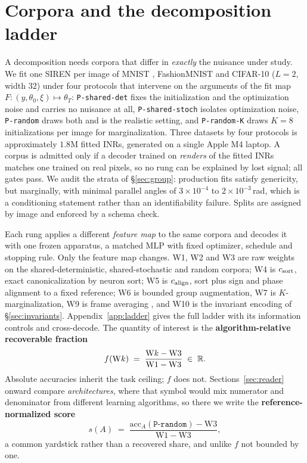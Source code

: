 \section{Corpora and the decomposition ladder}\label{sec:bench}

A decomposition needs corpora that differ in \emph{exactly} the nuisance under study. We fit one
SIREN per image of MNIST \citep{lecun1998mnist}, FashionMNIST \citep{xiao2017fashion} and CIFAR-10
\citep{krizhevsky2009cifar} ($L=2$, width $32$) under four protocols that intervene on the arguments
of the fit map $F : (y, \theta_0, \xi) \mapsto \theta_T$: \texttt{P-shared-det} fixes the
initialization and the optimization noise and carries no nuisance at all, \texttt{P-shared-stoch}
isolates optimization noise, \texttt{P-random} draws both and is the realistic setting, and
\texttt{P-random-K} draws $K=8$ initializations per image for marginalization. Three datasets by
four protocols is approximately $1.8$M fitted INRs, generated on a single Apple M4 laptop. A corpus
is admitted only if a decoder trained on \emph{renders} of the fitted INRs matches one trained on
real pixels, so no rung can be explained by lost signal; all gates pass. We audit the strata of
\S\ref{sec:group}: production fits satisfy genericity, but marginally, with minimal parallel angles
of $3\times10^{-4}$ to $2\times10^{-3}$\,rad, which is a conditioning statement rather than an
identifiability failure. Splits are assigned by image and enforced by a schema check.

Each rung applies a different \emph{feature map} to the same corpora and decodes it with one frozen
apparatus, a matched MLP with fixed optimizer, schedule and stopping rule. Only the feature map
changes. W1, W2 and W3 are raw weights on the shared-deterministic, shared-stochastic and random
corpora; W4 is $c_{\mathrm{sort}}$, exact canonicalization by neuron sort; W5 is $c_{\mathrm{align}}$, sort plus sign and
phase alignment to a fixed reference; W6 is bounded group augmentation, W7 is $K$-marginalization,
W9 is frame averaging \citep{puny2022frame}, and W10 is the invariant encoding of
\S\ref{sec:invariants}. Appendix~\ref{app:ladder} gives the full ladder with its information
controls and cross-decode. The quantity of interest is the \textbf{algorithm-relative recoverable
fraction}
\begin{equation}
f(\mathrm{W}k) \;=\; \frac{\mathrm{W}k - \mathrm{W3}}{\mathrm{W1} - \mathrm{W3}} \;\in\; \mathbb{R} .
\label{eq:f}
\end{equation}
Absolute accuracies inherit the task ceiling; $f$ does not. Sections~\ref{sec:reader} onward compare
\emph{architectures}, where that symbol would mix numerator and denominator from different learning
algorithms, so there we write the \textbf{reference-normalized score}
\begin{equation}
s(A) \;=\; \frac{\mathrm{acc}_A(\texttt{P-random}) - \mathrm{W3}}{\mathrm{W1} - \mathrm{W3}},
\label{eq:s}
\end{equation}
a common yardstick rather than a recovered share, and unlike $f$ not bounded by one.

